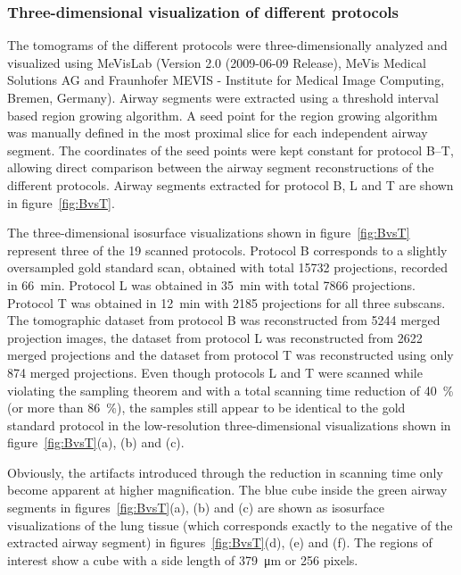 \subsubsection{Three-dimensional visualization of different protocols}
\label{subsec:comparison}
The tomograms of the different protocols were three-dimensionally analyzed and visualized using MeVisLab (Version 2.0 (2009-06-09 Release), MeVis Medical Solutions AG and Fraunhofer MEVIS - Institute for Medical Image Computing, Bremen, Germany). Airway segments were extracted using a threshold interval based region growing algorithm. A seed point for the region growing algorithm was manually defined in the most proximal slice for each independent airway segment. The coordinates of the seed points were kept constant for protocol B--T, allowing direct comparison between the airway segment reconstructions of the different protocols. Airway segments extracted for protocol B, L and T are shown in figure~\ref{fig:BvsT}.

The three-dimensional isosurface visualizations shown in figure~\ref{fig:BvsT} represent three of the 19 scanned protocols. Protocol B corresponds to a slightly oversampled gold standard scan, obtained with total 15732 projections, recorded in \SI{66}{\minute}. Protocol L was obtained in \SI{35}{\minute} with total 7866 projections. Protocol T was obtained in \SI{12}{\minute} with 2185 projections for all three subscans. The tomographic dataset from protocol B was reconstructed from 5244 merged projection images, the dataset from protocol L was reconstructed from 2622 merged projections and the dataset from protocol T was reconstructed using only 874 merged projections. Even though protocols L and T were scanned while violating the sampling theorem and with a total scanning time reduction of \SI{40}{\percent} (or more than \SI{86}{\percent}), the samples still appear to be identical to the gold standard protocol in the low-resolution three-dimensional visualizations shown in figure~\ref{fig:BvsT}(a), (b) and (c).

Obviously, the artifacts introduced through the reduction in scanning time only become apparent at higher magnification. The blue cube inside the green airway segments in figures~\ref{fig:BvsT}(a), (b) and (c) are shown as isosurface visualizations of the lung tissue (which corresponds exactly to the negative of the extracted airway segment) in figures~\ref{fig:BvsT}(d), (e) and (f). The regions of interest show a cube with a side length of \SI{379}{\micro\meter} or 256 pixels.

